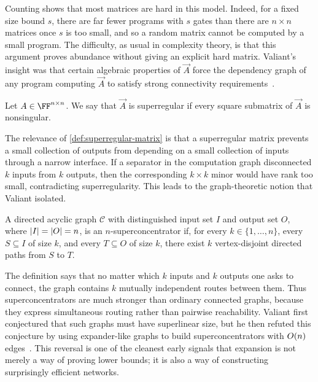 Counting shows that most matrices are hard in this model. Indeed, for a fixed size bound \(s\), there are far fewer programs with \(s\) gates than there are \(n\times n\) matrices once \(s\) is too small, and so a random matrix cannot be computed by a small program. The difficulty, as usual in complexity theory, is that this argument proves abundance without giving an explicit hard matrix. Valiant's insight was that certain algebraic properties of \(\vec{A}\) force the dependency graph of any program computing \(\vec{A}\) to satisfy strong connectivity requirements~\cite{Val1976}.

\begin{definition}
	\label{def:superregular-matrix}
	Let \(\vec{A}\in \FF^{n\times n}\). We say that \(\vec{A}\) is superregular if every square submatrix of \(\vec{A}\) is nonsingular.
\end{definition}

The relevance of \cref{def:superregular-matrix} is that a superregular matrix prevents a small collection of outputs from depending on a small collection of inputs through a narrow interface. If a separator in the computation graph disconnected \(k\) inputs from \(k\) outputs, then the corresponding \(k\times k\) minor would have rank too small, contradicting superregularity. This leads to the graph-theoretic notion that Valiant isolated.

\begin{definition}[Superconcentrator]
	\label{def:superconcentrator}
	A directed acyclic graph \(\mathcal{C}\) with distinguished input set \(I\) and output set \(O\), where \(\lvert I\rvert=\lvert O\rvert=n\), is an \(n\)-superconcentrator if, for every \(k\in\{1,\ldots,n\}\), every \(S\subseteq I\) of size \(k\), and every \(T\subseteq O\) of size \(k\), there exist \(k\) vertex-disjoint directed paths from \(S\) to \(T\).
\end{definition}

The definition says that no matter which \(k\) inputs and \(k\) outputs one asks to connect, the graph contains \(k\) mutually independent routes between them. Thus superconcentrators are much stronger than ordinary connected graphs, because they express simultaneous routing rather than pairwise reachability. Valiant first conjectured that such graphs must have superlinear size, but he then refuted this conjecture by using expander-like graphs to build superconcentrators with \(\bigO(n)\) edges~\cite{Val1976}. This reversal is one of the cleanest early signals that expansion is not merely a way of proving lower bounds; it is also a way of constructing surprisingly efficient networks.

